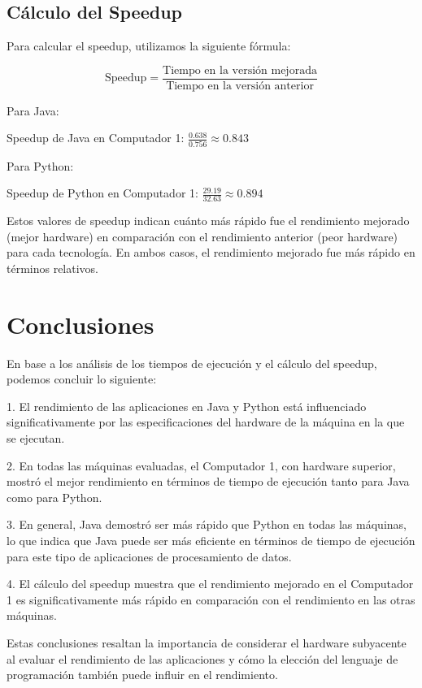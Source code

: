 \documentclass[conference]{IEEEtran}
\begin{document}
\subsection{Cálculo del Speedup}

Para calcular el speedup, utilizamos la siguiente fórmula:

\[ \text{Speedup} = \frac{\text{Tiempo en la versión mejorada}}{\text{Tiempo en la versión anterior}} \]

Para Java:

Speedup de Java en Computador 1: \( \frac{0.638}{0.756} \approx 0.843 \)

Para Python:

Speedup de Python en Computador 1: \( \frac{29.19}{32.63} \approx 0.894 \)

Estos valores de speedup indican cuánto más rápido fue el rendimiento mejorado (mejor hardware) en comparación con el rendimiento anterior (peor hardware) para cada tecnología. En ambos casos, el rendimiento mejorado fue más rápido en términos relativos.

\section{Conclusiones}

En base a los análisis de los tiempos de ejecución y el cálculo del speedup, podemos concluir lo siguiente:

1. El rendimiento de las aplicaciones en Java y Python está influenciado significativamente por las especificaciones del hardware de la máquina en la que se ejecutan.

2. En todas las máquinas evaluadas, el Computador 1, con hardware superior, mostró el mejor rendimiento en términos de tiempo de ejecución tanto para Java como para Python.

3. En general, Java demostró ser más rápido que Python en todas las máquinas, lo que indica que Java puede ser más eficiente en términos de tiempo de ejecución para este tipo de aplicaciones de procesamiento de datos.

4. El cálculo del speedup muestra que el rendimiento mejorado en el Computador 1 es significativamente más rápido en comparación con el rendimiento en las otras máquinas.

Estas conclusiones resaltan la importancia de considerar el hardware subyacente al evaluar el rendimiento de las aplicaciones y cómo la elección del lenguaje de programación también puede influir en el rendimiento.
\end{document}
